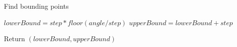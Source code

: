 \documentclass{article}
\begin{document}
\begin{algorithm}
\caption{Find  bounding points }
\label{array-sum}
\begin{algorithmic}[1]
    \State $lowerBound = step * floor(angle/step)$
	\State $upperBound = lowerBound+step$

	\State Return $(lowerBound,upperBound)$
\EndProcedure
\end{algorithmic}
\end{algorithm}
\end{document}
